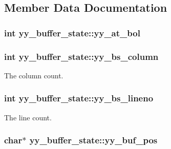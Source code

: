 \subsection{Member Data Documentation}
\hypertarget{structyy__buffer__state_a9d60c60af6e1a6f69de16871fd64f85f}{
\subsubsection[{yy\-\_\-at\-\_\-bol}]{\setlength{\rightskip}{0pt plus 5cm}int yy\-\_\-buffer\-\_\-state\-::yy\-\_\-at\-\_\-bol}}\label{structyy__buffer__state_a9d60c60af6e1a6f69de16871fd64f85f}
\hypertarget{structyy__buffer__state_a10c4fcd8be759e6bf11e6d3e8cdb0307}{
\subsubsection[{yy\-\_\-bs\-\_\-column}]{\setlength{\rightskip}{0pt plus 5cm}int yy\-\_\-buffer\-\_\-state\-::yy\-\_\-bs\-\_\-column}}\label{structyy__buffer__state_a10c4fcd8be759e6bf11e6d3e8cdb0307}
The column count. \hypertarget{structyy__buffer__state_a818e94bc9c766e683c60df1e9fd01199}{
\subsubsection[{yy\-\_\-bs\-\_\-lineno}]{\setlength{\rightskip}{0pt plus 5cm}int yy\-\_\-buffer\-\_\-state\-::yy\-\_\-bs\-\_\-lineno}}\label{structyy__buffer__state_a818e94bc9c766e683c60df1e9fd01199}
The line count. \hypertarget{structyy__buffer__state_a58aa927f098b99d99e75da80f9b681ef}{
\subsubsection[{yy\-\_\-buf\-\_\-pos}]{\setlength{\rightskip}{0pt plus 5cm}char$\ast$ yy\-\_\-buffer\-\_\-state\-::yy\-\_\-buf\-\_\-pos}}\label{structyy__buffer__state_a58aa927f098b99d99e75da80f9b681ef}
